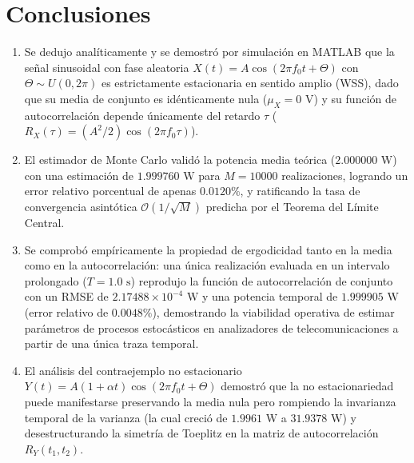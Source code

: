 \documentclass[conference]{IEEEtran}
\begin{document}
\section{Conclusiones}
\begin{enumerate}
    \item Se dedujo analíticamente y se demostró por simulación en MATLAB que la señal sinusoidal con fase aleatoria $X(t) = A\cos(2\pi f_0 t + \Theta)$ con $\Theta \sim U(0, 2\pi)$ es estrictamente estacionaria en sentido amplio (WSS), dado que su media de conjunto es idénticamente nula ($\mu_X = 0\text{ V}$) y su función de autocorrelación depende únicamente del retardo $\tau$ ($R_X(\tau) = (A^2/2)\cos(2\pi f_0 \tau)$).
    \item El estimador de Monte Carlo validó la potencia media teórica ($2.000000\text{ W}$) con una estimación de $1.999760\text{ W}$ para $M = 10000$ realizaciones, logrando un error relativo porcentual de apenas $0.0120\%$, y ratificando la tasa de convergencia asintótica $\mathcal{O}(1/\sqrt{M})$ predicha por el Teorema del Límite Central.
    \item Se comprobó empíricamente la propiedad de ergodicidad tanto en la media como en la autocorrelación: una única realización evaluada en un intervalo prolongado ($T = 1.0\text{ s}$) reprodujo la función de autocorrelación de conjunto con un RMSE de $2.17488 \times 10^{-4}\text{ W}$ y una potencia temporal de $1.999905\text{ W}$ (error relativo de $0.0048\%$), demostrando la viabilidad operativa de estimar parámetros de procesos estocásticos en analizadores de telecomunicaciones a partir de una única traza temporal.
    \item El análisis del contraejemplo no estacionario $Y(t) = A(1+\alpha t)\cos(2\pi f_0 t + \Theta)$ demostró que la no estacionariedad puede manifestarse preservando la media nula pero rompiendo la invarianza temporal de la varianza (la cual creció de $1.9961\text{ W}$ a $31.9378\text{ W}$) y desestructurando la simetría de Toeplitz en la matriz de autocorrelación $R_Y(t_1, t_2)$.
\end{enumerate}
\end{document}
